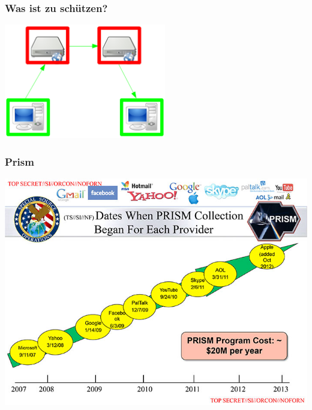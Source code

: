 \documentclass[12pt]{beamer}
\begin{document}
\begin{frame}
    \frametitle{Was ist zu schützen?}
    \begin{center}
      \includegraphics[height=5cm]{img/fed-clients-comm.png}
    \end{center}
\end{frame}

\begin{frame}
    \frametitle{Prism}
    \begin{center}
      \includegraphics[height=0.7\textheight]{img/prism.jpg}
    \end{center}
\end{frame}
\end{document}
